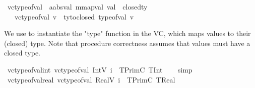 \begin{isabellebody}
\isanewline
{}\isamarkupfalse%
\ vc{\isacharunderscore}{\kern0pt}type{\isacharunderscore}{\kern0pt}of{\isacharunderscore}{\kern0pt}val\ {\isacharcolon}{\kern0pt}{\isacharcolon}{\kern0pt}\ {\isachardoublequoteopen}{\isacharparenleft}{\kern0pt}{\isacharprime}{\kern0pt}a{\isacharcolon}{\kern0pt}{\isacharcolon}{\kern0pt}absval{\isacharcomma}{\kern0pt}\ {\isacharprime}{\kern0pt}m{\isacharcolon}{\kern0pt}{\isacharcolon}{\kern0pt}mapval{\isacharparenright}{\kern0pt}\ val\ {\isasymRightarrow}\ closed{\isacharunderscore}{\kern0pt}ty{\isachardoublequoteclose}\isanewline
\ \ \isanewline
\ \ \ {\isachardoublequoteopen}vc{\isacharunderscore}{\kern0pt}type{\isacharunderscore}{\kern0pt}of{\isacharunderscore}{\kern0pt}val\ v\ {\isacharequal}{\kern0pt}\ ty{\isacharunderscore}{\kern0pt}to{\isacharunderscore}{\kern0pt}closed\ {\isacharparenleft}{\kern0pt}type{\isacharunderscore}{\kern0pt}of{\isacharunderscore}{\kern0pt}val\ v{\isacharparenright}{\kern0pt}{\isachardoublequoteclose}%
\begin{isamarkuptext}%
We use  to instantiate the "type" function in the VC, which maps values 
to their (closed) type. Note that procedure correctness assumes that values must have a closed type.%
\end{isamarkuptext}\isamarkuptrue%
\isamarkupfalse%
\ vc{\isacharunderscore}{\kern0pt}type{\isacharunderscore}{\kern0pt}of{\isacharunderscore}{\kern0pt}val{\isacharunderscore}{\kern0pt}int{\isacharcolon}{\kern0pt}\ {\isachardoublequoteopen}vc{\isacharunderscore}{\kern0pt}type{\isacharunderscore}{\kern0pt}of{\isacharunderscore}{\kern0pt}val\ {\isacharparenleft}{\kern0pt}IntV\ i{\isacharparenright}{\kern0pt}\ {\isacharequal}{\kern0pt}\ TPrimC\ TInt{\isachardoublequoteclose}\isanewline
%
\isadelimproof
\ \ %
\endisadelimproof
%
\isatagproof
{}\isamarkupfalse%
\ simp%
\endisatagproof
{\isafoldproof}%
%
\isadelimproof
\isanewline
%
\endisadelimproof
\isanewline
{}\isamarkupfalse%
\ vc{\isacharunderscore}{\kern0pt}type{\isacharunderscore}{\kern0pt}of{\isacharunderscore}{\kern0pt}val{\isacharunderscore}{\kern0pt}real{\isacharcolon}{\kern0pt}\ {\isachardoublequoteopen}vc{\isacharunderscore}{\kern0pt}type{\isacharunderscore}{\kern0pt}of{\isacharunderscore}{\kern0pt}val\ {\isacharparenleft}{\kern0pt}RealV\ i{\isacharparenright}{\kern0pt}\ {\isacharequal}{\kern0pt}\ TPrimC\ TReal{\isachardoublequoteclose}\isanewline
%
\isadelimproof

\end{isabellebody}
